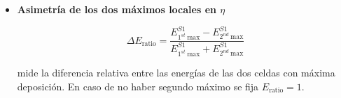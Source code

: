 \begin{itemize}
	\item  \textbf{Asimetría de los dos máximos locales en $\eta$}

		\begin{equation}
		\Delta E_{\text{ratio}}=\frac{E_{1^{st} \:\text{max}}^{S1} - E_{2^{nd} \:\text{max}}^{S1}}{E_{1^{st} \:\text{max}}^{S1} + E_{2^{nd} \:\text{max}}^{S1}}
		\end{equation}
 
 		mide la diferencia relativa entre las energías de las dos celdas con máxima deposición. En caso de no haber segundo máximo se fija $E_{\text{ratio}} = 1$.


\end{itemize}

\renewcommand{\arraystretch}{1.0}
\begin{table}	
\centering
\caption{Detalle de las diferentes variables usadas para la selección \textit{loose} (L) y \textit{tight} (T) de fotones y electrones. El $\checkmark$ indica cuándo la selección requiere de esa variable\cite{ATLAS:2016iqc} \cite{Tripiana:1433788}.}
\end{table}
